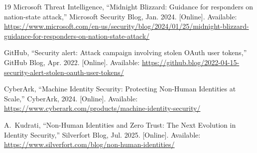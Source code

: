 \documentclass[journal]{IEEEtran}
\begin{document}
\begin{thebibliography}{19}
Microsoft Threat Intelligence, ``Midnight Blizzard: Guidance for responders on nation-state attack,'' Microsoft Security Blog, Jan. 2024. [Online]. Available: \url{https://www.microsoft.com/en-us/security/blog/2024/01/25/midnight-blizzard-guidance-for-responders-on-nation-state-attack/}

GitHub, ``Security alert: Attack campaign involving stolen OAuth user tokens,'' GitHub Blog, Apr. 2022. [Online]. Available: \url{https://github.blog/2022-04-15-security-alert-stolen-oauth-user-tokens/}

CyberArk, ``Machine Identity Security: Protecting Non-Human Identities at Scale,'' CyberArk, 2024. [Online]. Available: \url{https://www.cyberark.com/products/machine-identity-security/}

A.~Kudrati, ``Non-Human Identities and Zero Trust: The Next Evolution in Identity Security,'' Silverfort Blog, Jul. 2025. [Online]. Available: \url{https://www.silverfort.com/blog/non-human-identities/}

\end{thebibliography}
\end{document}
